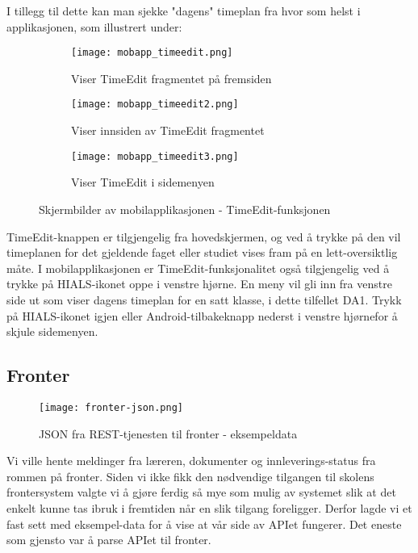 \documentclass[../main.tex]{subfiles}
\begin{document}
I tillegg til dette kan man sjekke "dagens" timeplan fra hvor som helst i applikasjonen, som illustrert under:

\begin{figure}[H]
        \centering
        \begin{subfigure}[b]{0.3\textwidth}
                \centering
                \texttt{[image: mobapp\_timeedit.png]}
                \caption{Viser TimeEdit fragmentet på fremsiden}
        \end{subfigure}
        \quad
        \begin{subfigure}[b]{0.3\textwidth}
                \centering
                \texttt{[image: mobapp\_timeedit2.png]}
                \caption{Viser innsiden av TimeEdit fragmentet}
        \end{subfigure}
        \quad
                \begin{subfigure}[b]{0.3\textwidth}
                        \centering
                        \texttt{[image: mobapp\_timeedit3.png]}
                        \caption{Viser TimeEdit i sidemenyen}
                \end{subfigure}
        \caption{Skjermbilder av mobilapplikasjonen - TimeEdit-funksjonen}
\end{figure}

TimeEdit-knappen er tilgjengelig fra hovedskjermen, og ved å trykke på den vil timeplanen for det gjeldende faget eller studiet vises fram på en lett-oversiktlig måte.
I mobilapplikasjonen er TimeEdit-funksjonalitet også tilgjengelig ved å trykke på HIALS-ikonet oppe i venstre hjørne. En meny vil gli inn fra venstre side ut som viser dagens timeplan for en satt klasse, i dette tilfellet DA1. Trykk på HIALS-ikonet igjen eller Android-tilbakeknapp nederst i venstre hjørnefor å skjule sidemenyen.








\subsection{Fronter}

\begin{figure}[H]
  \centering
  \texttt{[image: fronter-json.png]}
  \caption{JSON fra REST-tjenesten til fronter - eksempeldata}
\end{figure}

Vi ville hente meldinger fra læreren, dokumenter og innleverings-status fra rommen på fronter.\newline
\newline
Siden vi ikke fikk den nødvendige tilgangen til skolens frontersystem valgte vi å gjøre ferdig så mye som mulig av systemet slik at det enkelt kunne tas ibruk i fremtiden når en slik tilgang foreligger. Derfor lagde vi et fast sett med eksempel-data for å vise at vår side av APIet fungerer. Det eneste som gjensto var å parse APIet til fronter.
\end{document}
